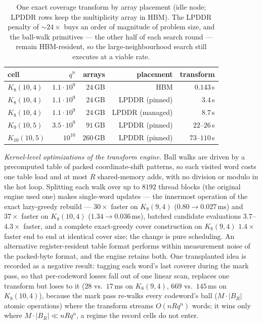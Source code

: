 \documentclass[11pt]{amsart}
\newcommand{\Kq}[3]{K_{#1}(#2,#3)}
\begin{document}
\begin{table}[ht]
\centering
\begin{tabular}{lrrrr}
\toprule
cell & $q^n$ & arrays & placement & transform \\
\midrule
$\Kq{8}{10}{4}$ & $1.1\cdot 10^9$ & $24$\,GB & HBM & $0.143$\,s \\
$\Kq{8}{10}{4}$ & $1.1\cdot 10^9$ & $24$\,GB & LPDDR (pinned) & $3.4$\,s \\
$\Kq{8}{10}{4}$ & $1.1\cdot 10^9$ & $24$\,GB & LPDDR (managed) & $8.7$\,s \\
$\Kq{9}{10}{5}$ & $3.5\cdot 10^9$ & $91$\,GB & LPDDR (pinned) & $22$--$26$\,s \\
$\Kq{10}{10}{5}$ & $10^{10}$ & $260$\,GB & LPDDR (pinned) & $73$--$110$\,s \\
\bottomrule
\end{tabular}
\caption{One exact coverage transform by array placement (idle node; LPDDR
rows keep the multiplicity array in HBM). The LPDDR penalty of
$\sim\!24\times$ buys an order of magnitude of problem size, and the
ball-walk primitives --- the other half of each search round --- remain
HBM-resident, so the large-neighbourhood search still executes at a viable
rate.}
\label{tab:hc}
\end{table}

\emph{Kernel-level optimizations of the transform engine.} Ball walks are
driven by a precomputed table of packed coordinate-shift patterns, so each
visited word costs one table load and at most $R$ shared-memory adds, with
no division or modulo in the hot loop. Splitting each walk over up to
$8192$ thread blocks (the original engine used one) makes single-word
updates --- the innermost operation of the exact lazy-greedy rebuild ---
$30\times$ faster on $\Kq{8}{9}{4}$ ($0.80\to 0.027$\,ms) and $37\times$
faster on $\Kq{8}{10}{4}$ ($1.34\to 0.036$\,ms), batched candidate
evaluations $3.7$--$4.3\times$ faster, and a complete exact-greedy cover
construction on $\Kq{8}{9}{4}$ $1.4\times$ faster end to end at identical
cover size; the change is pure scheduling. An alternative
register-resident table format performs within measurement noise of the
packed-byte format, and the engine retains both. One transplanted idea is
recorded as a negative result: tagging each word's last coverer during the
mark pass, so that per-codeword losses fall out of one linear scan,
replaces one transform but loses to it ($28$ vs.\ $17$\,ms on
$\Kq{8}{9}{4}$, $669$ vs.\ $145$\,ms on $\Kq{8}{10}{4}$), because the mark
pass re-walks every codeword's ball ($M\cdot|B_R|$ atomic operations)
where the transform streams $O(nRq^n)$ words; it wins only where
$M\cdot|B_R|\ll nRq^n$, a regime the record cells do not enter.
\end{document}
